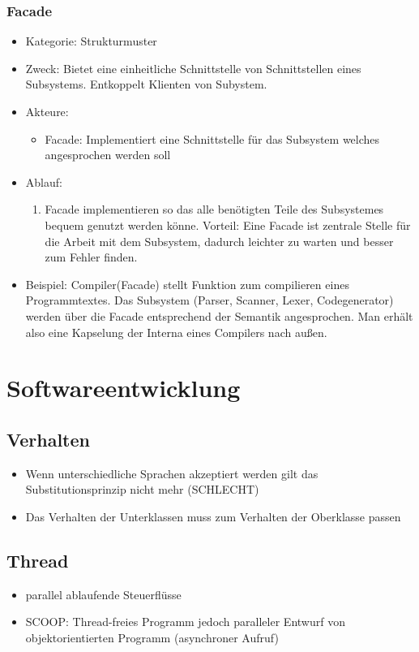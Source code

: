 \documentclass[11pt, fleqn, a4paper, leqno]{scrartcl} %
\begin{document}
		\subsubsection{Facade}
			\begin{itemize}
				\item Kategorie: Strukturmuster
				\item Zweck: Bietet eine einheitliche Schnittstelle von Schnittstellen eines Subsystems. Entkoppelt Klienten von Subystem.
				\item Akteure: 
					\begin{itemize}
						\item Facade: Implementiert eine Schnittstelle für das Subsystem welches angesprochen werden soll
					\end{itemize}
				\item Ablauf:
					\begin{enumerate}
						\item Facade implementieren so das alle benötigten Teile des Subsystemes bequem genutzt werden könne. Vorteil: Eine Facade ist zentrale Stelle für die Arbeit mit dem Subsystem, dadurch leichter zu warten und besser zum Fehler finden.
					\end{enumerate}
				\item Beispiel: Compiler(Facade) stellt Funktion zum compilieren eines Programmtextes. Das Subsystem (Parser, Scanner, Lexer, Codegenerator) werden über die Facade entsprechend der Semantik angesprochen. Man erhält also eine Kapselung der Interna eines Compilers nach außen. 
			\end{itemize}
	\section{Softwareentwicklung}
	\subsection{Verhalten}
		\begin{itemize}
			\item Wenn unterschiedliche Sprachen akzeptiert werden gilt das Substitutionsprinzip nicht mehr (SCHLECHT)
			\item Das Verhalten der Unterklassen muss zum Verhalten der Oberklasse passen
		\end{itemize}
	\subsection{Thread}
		\begin{itemize}
			\item parallel ablaufende Steuerflüsse
			\item SCOOP: Thread-freies Programm jedoch paralleler Entwurf von objektorientierten Programm (asynchroner Aufruf)
		\end{itemize}
\end{document}
